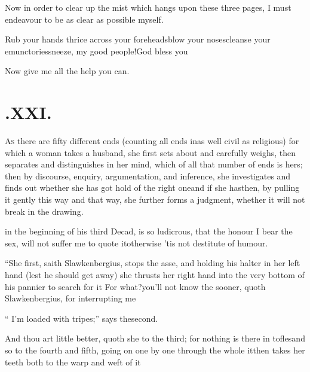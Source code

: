 \documentclass{article}
\begin{document}
\newpage
Now in order to clear up the mist which hangs upon these three
pages, I must endeavour to be as clear as possible myself.

Rub your hands thrice across your foreheads\tsk blow your
noses\tsk cleanse your emunctories\tsk sneeze, my good
people!\tsh God bless you\tsh

Now give me all the help you can.

\newpage
\section{.\enspace XXI.}

\lettrine{A}{s} there are fifty different ends\break
(counting all ends in\tsh as well civil as religious) for
which a woman takes a husband, she first sets about and
\break carefully
weighs, then separates and distinguishes in her mind, which of all
that number of ends is hers; then by discourse, enquiry,
argumentation, and inference, she investigates and finds out
whether she has got hold of the right one\tsh and if
she has\tsh then, by pulling it gently this way and that
way, she further forms a judgment, whether it will not break in the
drawing.

\noindent
{}
\pb
in the beginning of his third Decad, is so ludicrous, that the honour I bear
the sex, will not suffer me to quote it\tsh\break otherwise ’tis not destitute of
humour.

“She first, saith Slawkenbergius, stops the asse, and holding his halter in her left
hand (lest he should get away) she thrusts her right hand into the very bottom of
his pannier to search for it\tsk\break
For what?\tsk you’ll not know the sooner, quoth
Slawkenbergius, for interrupting me\tsh

\noindent
{}

“ I’m loaded with tripes;” says the\break second.

\tsh And thou art little better, quoth she to the third; for nothing is there in\pb
{}
tofles\tsk and so to the fourth and fifth, going on
one by one through the whole 
it\tsk then takes her teeth both to the warp and weft
of it\tsh
\end{document}
